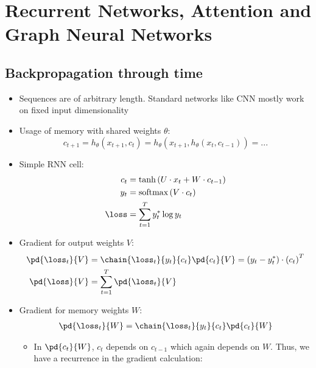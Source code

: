 \section{Recurrent Networks, Attention and Graph Neural Networks}
\subsection{Backpropagation through time}
\begin{itemize}
	\item Sequences are of arbitrary length. Standard networks like CNN mostly work on fixed input dimensionality
	\item Usage of memory with shared weights $\theta$: $$c_{t+1} = h_{\theta}\left(x_{t+1}, c_{t}\right) = h_{\theta}\left(x_{t+1}, h_{\theta}\left(x_{t}, c_{t-1}\right)\right) = ...$$
	\item Simple RNN cell: 
	\begin{equation*}
		\begin{split}
			c_t & = \tanh\left(U\cdot x_t + W \cdot c_{t-1}\right) \\
			y_t & = \text{softmax}\left(V \cdot c_{t}\right) \\
			\loss & = \sum\limits_{t=1}^{T} y_t^{*} \log y_t \\
		\end{split}
	\end{equation*}
	\item Gradient for output weights $V$:
	\begin{equation*}
		\begin{split}
			\pd{\loss_t}{V} & = \chain{\loss_t}{y_t}{c_t}\pd{c_t}{V} = \left(y_t - y_t^{*}\right) \cdot \left(c_t\right)^T\\
			\pd{\loss}{V} & = \sum\limits_{t=1}^{T} \pd{\loss_t}{V}\\
		\end{split}
	\end{equation*}
	\item Gradient for memory weights $W$: 
	\begin{equation*}
		\begin{split}
			\pd{\loss_t}{W} & = \chain{\loss_t}{y_t}{c_t}\pd{c_t}{W}\\
		\end{split}
	\end{equation*}
	\begin{itemize}
		\item In $\pd{c_t}{W}$, $c_t$ depends on $c_{t-1}$ which again depends on $W$. Thus, we have a recurrence in the gradient calculation:

\end{itemize}
\end{itemize}
